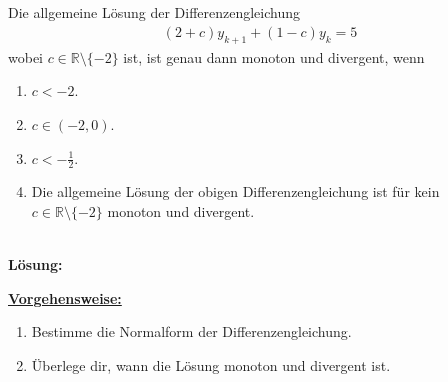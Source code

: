 \subsection*{}
Die allgemeine Lösung der Differenzengleichung
\begin{align*}
(2 + c) y_{k+1} + (1-c) y_k = 5
\end{align*}
wobei $c \in \mathbb{R} \setminus \lbrace -2 \rbrace$ ist, ist genau dann monoton und divergent, wenn
\renewcommand{\labelenumi}{(\alph{enumi})}
\begin{enumerate}
\item 
$ c < -2 $.
\item
$c \in (-2,0)$.
\item
$ c < -\frac{1}{2} $.
\item
Die allgemeine Lösung der obigen Differenzengleichung ist für kein $c \in \mathbb{R} \setminus \lbrace -2 \rbrace$ monoton und divergent.
\end{enumerate}
\ \\
\textbf{Lösung:}
\begin{mdframed}
\underline{\textbf{Vorgehensweise:}}
\renewcommand{\labelenumi}{\theenumi.}
\begin{enumerate}
\item Bestimme die Normalform der Differenzengleichung.
\item Überlege dir, wann die Lösung monoton und divergent ist.
\end{enumerate}
\end{mdframed}


